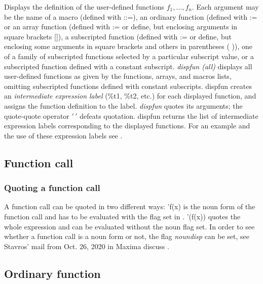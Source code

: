 \documentclass[../Maxima_Workbook.tex]{subfiles}
\begin{document}
\lzz {} \hfill \tcr{[function]}

\lz Displays the definition of the user-defined functions $ f_1, \dots, f_n $. Each argument may be the name of a macro (defined with ::=), an ordinary function (defined with := or an array function (defined with := or define, but enclosing arguments in square brackets []), a subscripted function (defined with := or define, but enclosing some arguments in square brackets and others in parentheses ( )), one of a family of subscripted functions selected by a particular subscript value, or a subscripted function defined with a constant subscript. \emph{dispfun (all)} displays all user-defined functions as given by the functions, arrays, and macros lists, omitting subscripted functions defined with constant subscripts. dispfun creates an \emph{intermediate expression label} (\%t1, \%t2, etc.) for each displayed function, and assigns the function definition to the label. \emph{dispfun} quotes its arguments; the quote-quote operator $ ' \, ' $ defeats quotation. dispfun returns the list of intermediate expression labels corresponding to the displayed functions. For an example and the use of these expression labels see \cite{MaxiManE}.

\subsection{Function call}

\subsubsection{Quoting a function call}\label{F7}

A function call can be quoted in two different ways: 'f(x) is the noun form of the function call and has to be evaluated with the  flag set in . '(f(x)) quotes the whole expression and can be evaluated without the noun flag set. In order to see whether a function call is a noun form or not, the flag \emph{noundisp} can be set, see Stavros' mail from Oct. 26, 2020 in Maxima discuss .

\subsection{Ordinary function}\label{F2}

\end{document}
